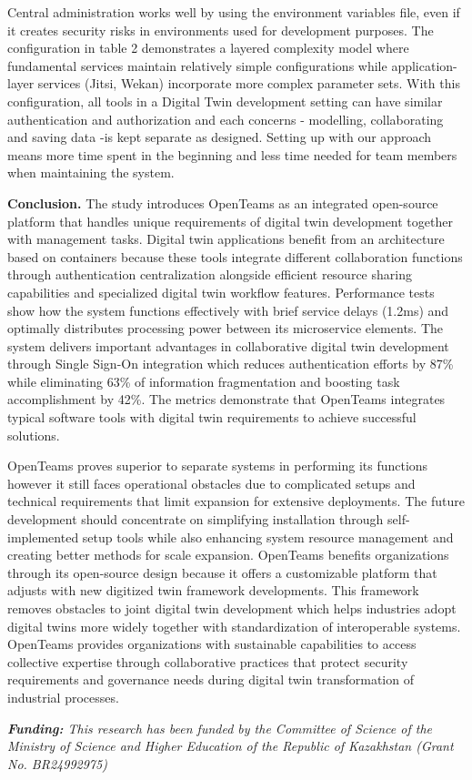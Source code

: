 \begin{multicols}{2}
Central administration works well by using the environment variables
file, even if it creates security risks in environments used for
development purposes. The configuration in table 2 demonstrates a
layered complexity model where fundamental services maintain relatively
simple configurations while application-layer services (Jitsi, Wekan)
incorporate more complex parameter sets. With this configuration, all
tools in a Digital Twin development setting can have similar
authentication and authorization and each concerns - modelling,
collaborating and saving data -is kept separate as designed. Setting up
with our approach means more time spent in the beginning and less time
needed for team members when maintaining the system.

{\bfseries Conclusion.} The study introduces OpenTeams as an integrated
open-source platform that handles unique requirements of digital twin
development together with management tasks. Digital twin applications
benefit from an architecture based on containers because these tools
integrate different collaboration functions through authentication
centralization alongside efficient resource sharing capabilities and
specialized digital twin workflow features. Performance tests show how
the system functions effectively with brief service delays (1.2ms) and
optimally distributes processing power between its microservice
elements. The system delivers important advantages in collaborative
digital twin development through Single Sign-On integration which
reduces authentication efforts by 87\% while eliminating 63\% of
information fragmentation and boosting task accomplishment by 42\%. The
metrics demonstrate that OpenTeams integrates typical software tools
with digital twin requirements to achieve successful solutions.

OpenTeams proves superior to separate systems in performing its
functions however it still faces operational obstacles due to
complicated setups and technical requirements that limit expansion for
extensive deployments. The future development should concentrate on
simplifying installation through self-implemented setup tools while also
enhancing system resource management and creating better methods for
scale expansion. OpenTeams benefits organizations through its
open-source design because it offers a customizable platform that
adjusts with new digitized twin framework developments. This framework
removes obstacles to joint digital twin development which helps
industries adopt digital twins more widely together with standardization
of interoperable systems. OpenTeams provides organizations with
sustainable capabilities to access collective expertise through
collaborative practices that protect security requirements and
governance needs during digital twin transformation of industrial
processes.

\emph{{\bfseries Funding:} This research has been funded by the Committee
of Science of the Ministry of Science and Higher Education of the
Republic of Kazakhstan (Grant No. BR24992975)}
\end{multicols}

